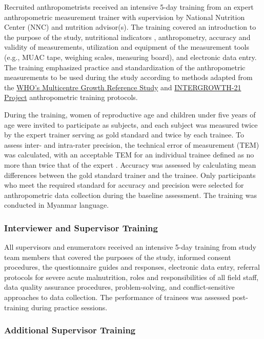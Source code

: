 \documentclass[12pt,a4paper]{article}
\begin{document}
Recruited anthropometrists received an intensive 5-day training from an expert anthropometric measurement trainer with supervision by National Nutrition Center (NNC) and nutrition advisor(s). The training covered an introduction to the purpose of the study, nutritional indicators , anthropometry, accuracy and validity of measurements, utilization and equipment of the measurement tools (e.g., MUAC tape, weighing scales, measuring board), and electronic data entry. The training emphasized practice and standardization of the anthropometric measurements to be used during the study according to methods adapted from the \href{https://www.who.int/childgrowth/mgrs/en/}{WHO's Multicentre Growth Reference Study} \citep{DeOnis2004} and \href{https://intergrowth21.tghn.org}{INTERGROWTH-21 Project} \citep{Ismail2013} anthropometric training protocols.

During the training, women of reproductive age and children under five years of age were invited to participate as subjects, and each subject was measured twice by the expert trainer serving as gold standard and twice by each trainee. To assess inter- and intra-rater precision, the technical error of measurement (TEM) was calculated, with an acceptable TEM for an individual trainee defined as no more than twice that of the expert \citep{ulijaszek_kerr_1999}. Accuracy was assessed by calculating mean differences between the gold standard trainer and the trainee. Only participants who meet the required standard for accuracy and precision were selected for anthropometric data collection during the baseline assessment. The training was conducted in Myanmar language.

\hypertarget{interview-training}{%
\subsubsection{Interviewer and Supervisor Training}\label{interview-training}}

All supervisors and enumerators received an intensive 5-day training from study team members that covered the purposes of the study, informed consent procedures, the questionnaire guides and responses, electronic data entry, referral protocols for severe acute malnutrition, roles and responsibilities of all field staff, data quality assurance procedures, problem-solving, and conflict-sensitive approaches to data collection. The performance of trainees was assessed post-training during practice sessions.

\hypertarget{add-training}{%
\subsubsection{Additional Supervisor Training}\label{add-training}}
\end{document}
